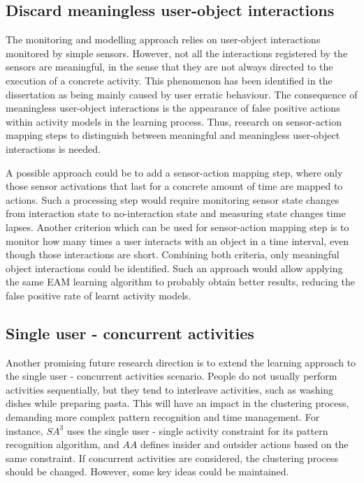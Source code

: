 \subsection{Discard meaningless user-object interactions}

The monitoring and modelling approach relies on user-object interactions monitored by simple sensors. However, not all the interactions registered by the sensors are meaningful, in the sense that they are not always directed to the execution of a concrete activity. This phenomenon has been identified in the dissertation as being mainly caused by user erratic behaviour. The consequence of meaningless user-object interactions is the appearance of false positive actions within activity models in the learning process. Thus, research on sensor-action mapping steps to distinguish between meaningful and meaningless user-object interactions is needed.

A possible approach could be to add a sensor-action mapping step, where only those sensor activations that last for a concrete amount of time are mapped to actions. Such a processing step would require monitoring sensor state changes from interaction state to no-interaction state and measuring state changes time lapses. Another criterion which can be used for sensor-action mapping step is to monitor how many times a user interacts with an object in a time interval, even though those interactions are short. Combining both criteria, only meaningful object interactions could be identified. Such an approach would allow applying the same EAM learning algorithm to probably obtain better results, reducing the false positive rate of learnt activity models.

\subsection{Single user - concurrent activities}

Another promising future research direction is to extend the learning approach to the single user - concurrent activities scenario. People do not usually perform activities sequentially, but they tend to interleave activities, such as washing dishes while preparing pasta. This will have an impact in the clustering process, demanding more complex pattern recognition and time management. For instance, $SA^3$ uses the single user - single activity constraint for its pattern recognition algorithm, and $AA$ defines insider and outsider actions based on the same constraint. If concurrent activities are considered, the clustering process should be changed. However, some key ideas could be maintained. 

